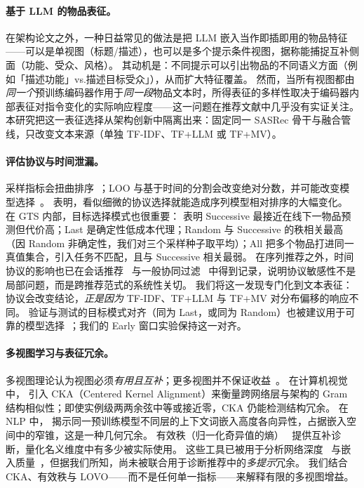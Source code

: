 \documentclass[sigconf,natbib=true,anonymous]{acmart}
\newcommand{\tfidf}{\textsc{TF-IDF}\xspace}
\newcommand{\tfllm}{\textsc{TF+LLM}\xspace}
\newcommand{\tfmv}{\textsc{TF+MV}\xspace}
\begin{document}
\paragraph{基于 LLM 的物品表征。}
在架构论文之外，一种日益常见的做法是把 LLM 嵌入当作即插即用的物品特征——可以是单视图（标题/描述），也可以是多个提示条件视图，据称能捕捉互补侧面（功能、受众、风格）。
其动机是：不同提示可以引出物品的不同语义方面（例如「描述功能」vs.\「描述目标受众」），从而扩大特征覆盖。
然而，当所有视图都由\emph{同一个}预训练编码器作用于\emph{同一段}物品文本时，所得表征的多样性取决于编码器内部表征对指令变化的实际响应程度——这一问题在推荐文献中几乎没有实证关注。
本研究把这一表征选择从架构创新中隔离出来：固定同一 SASRec 骨干与融合管线，只改变文本来源（单独 \tfidf、\tfllm 或 \tfmv）。

\paragraph{评估协议与时间泄漏。}
采样指标会扭曲排序~\cite{krichene2020sampledmetrics}；LOO 与基于时间的分割会改变绝对分数，并可能改变模型选择~\cite{ji2023evaluation,sun2023reevaluation,meng2020temporal}。
\citet{hidasi2018recurrent} 表明，看似细微的协议选择就能造成序列模型相对排序的大幅变化。
在 GTS 内部，目标选择模式也很重要：\citet{gusak2025time} 表明 Successive 最接近在线下一物品预测但代价高；Last 是确定性低成本代理；Random 与 Successive 的秩相关最高（因 Random 非确定性，我们对三个采样种子取平均）；All 把多个物品打进同一真值集合，引入任务不匹配，且与 Successive 相关最弱。
在序列推荐之外，时间协议的影响也已在会话推荐~\cite{hidasi2018recurrent} 与一般协同过滤~\cite{meng2020temporal} 中得到记录，说明协议敏感性不是局部问题，而是跨推荐范式的系统性关切。
我们将这一发现专门化到文本表征：协议会改变结论，\emph{正是因为} \tfidf、\tfllm 与 \tfmv 对分布偏移的响应不同。
验证与测试的目标模式对齐（同为 Last，或同为 Random）也被建议用于可靠的模型选择~\cite{gusak2025time}；我们的 Early 窗口实验保持这一对齐。

\paragraph{多视图学习与表征冗余。}
多视图理论认为视图必须\emph{有用且互补}；更多视图并不保证收益~\cite{xu2013multiview}。
在计算机视觉中，\citet{kornblith2019cka} 引入 CKA（Centered Kernel Alignment）来衡量跨网络层与架构的 Gram 结构相似性；即使实例级两两余弦中等或接近零，CKA 仍能检测结构冗余。
在 NLP 中，\citet{ethayarajh2019contextual} 揭示同一预训练模型不同层的上下文词嵌入高度各向异性，占据嵌入空间中的窄锥，这是一种几何冗余。
有效秩（归一化奇异值的熵）~\cite{roy2007effective} 提供互补诊断，量化名义维度中有多少被实际使用。
这些工具已被用于分析网络深度~\cite{kornblith2019cka} 与嵌入质量~\cite{ethayarajh2019contextual}，但据我们所知，尚未被联合用于诊断推荐中的\emph{多提示}冗余。
我们结合 CKA、有效秩与 LOVO——而不是任何单一指标——来解释有限的多视图增益。
\end{document}
